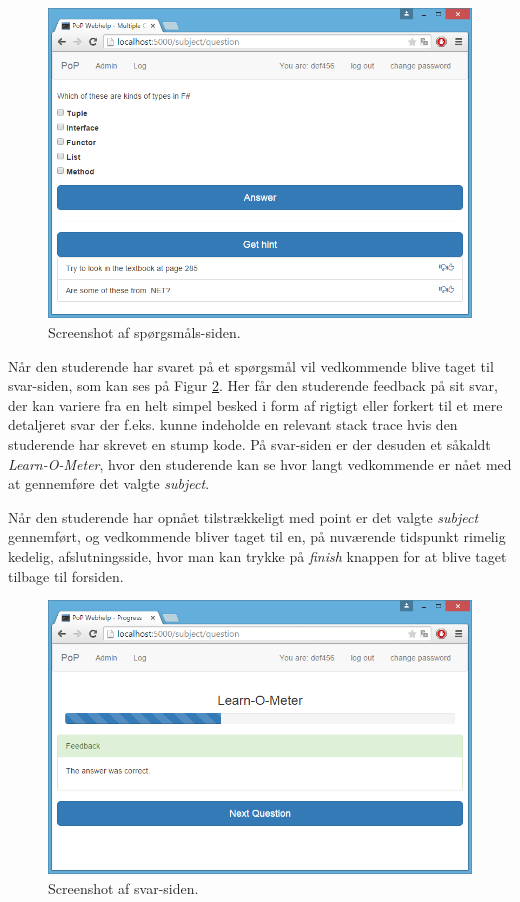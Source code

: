 \documentclass[11pt, a4paper]{article}
\begin{document}
\begin{figure}[htpb]
    \centering
    \includegraphics[width=1\linewidth]{figures/interface/question.png}
    \caption{Screenshot af spørgsmåls-siden.}
    \label{fig:screenshot_question}
\end{figure}

Når den studerende har svaret på et spørgsmål vil vedkommende blive taget til svar-siden, som kan ses på Figur \ref{fig:screenshot_answer}. Her får den studerende feedback på sit svar, der kan variere fra en helt simpel besked i form af rigtigt eller forkert til et mere detaljeret svar der f.eks. kunne indeholde en relevant stack trace hvis den studerende har skrevet en stump kode. På svar-siden er der desuden et såkaldt \emph{Learn-O-Meter}, hvor den studerende kan se hvor langt vedkommende er nået med at gennemføre det valgte \emph{subject}.

Når den studerende har opnået tilstrækkeligt med point er det valgte \emph{subject} gennemført, og vedkommende bliver taget til en, på nuværende tidspunkt rimelig kedelig, afslutningsside, hvor man kan trykke på \emph{finish} knappen for at blive taget tilbage til forsiden.

\begin{figure}[htpb]
    \centering
    \includegraphics[width=1\linewidth]{figures/interface/answer.png}
    \caption{Screenshot af svar-siden.}
    \label{fig:screenshot_answer}
\end{figure}
\end{document}
